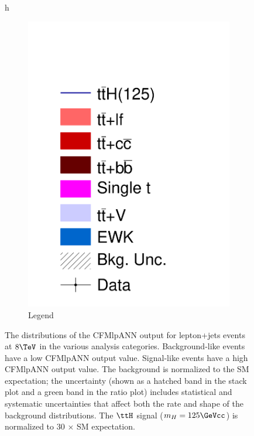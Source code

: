 \begin{figure}{h}
\begin{subfigure}[h]{0.25\textwidth}
        \includegraphics[width=\textwidth]{Figures/Analysis_1_Diagrams/samples_legend_tall_noTTHscale.pdf}
        \caption{Legend}\label{lj_ANNoutput_8TeV_8_leg}
      \end{subfigure}
      \caption{The distributions of the CFMlpANN output for lepton+jets
     events at $8 \TeV$ in the various analysis categories.
     Background-like events have a
     low CFMlpANN output value. Signal-like events have a high
     CFMlpANN output value.  The background is normalized to the SM expectation; 
     the uncertainty (shown as a
     hatched band in the stack plot and a green band in the ratio
     plot) includes statistical and systematic uncertainties that
     affect both the rate and shape of the background distributions.
     The $\ttH$ signal ($m_{H} = 125 \GeVcc$) is normalized to
     30 $\times$ SM expectation.}  \label{fig:lj_ANNoutput_8TeV}
\end{figure}


